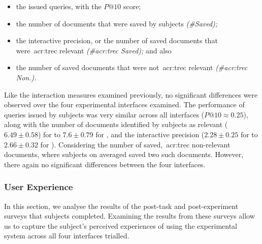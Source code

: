 \begin{itemize}
    \item{the issued queries, with the $P@10$ score;}
    \item{the number of documents that were saved by subjects \emph{(\#Saved);}}
    \item{the interactive precision, or the number of saved documents that were~\gls{acr:trec} relevant \emph{(\#\gls{acr:trec} Saved);} and also}
    \item{the number of saved documents that were not~\gls{acr:trec} relevant \emph{(\#\gls{acr:trec} Non.).}}
\end{itemize}

Like the interaction measures examined previously, no significant differences were observed over the four experimental interfaces examined. The performance of queries issued by subjects was very similar across all interfaces ($P@10 \approx 0.25$), along with the number of documents identified by subjects as relevant ($6.49\pm0.58$) for  to $7.6\pm0.79$ for , and the interactive precision ($2.28\pm0.25$ for  to $2.66\pm0.32$ for ). Considering the number of saved,~\gls{acr:trec} non-relevant documents, where subjects on averaged saved two such documents. However, there again no significant differences between the four interfaces.

\subsubsection{User Experience}\label{chap:snippets:user:results:ux}
In this section, we analyse the results of the post-task and post-experiment surveys that subjects completed. Examining the results from these surveys allow us to capture the subject's perceived experiences of using the experimental system across all four interfaces trialled.


